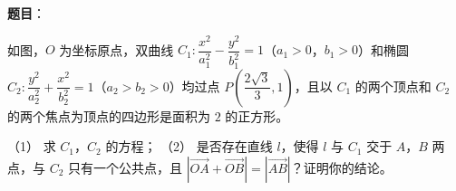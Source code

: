 \begin{answer}


\end{answer}
\begin{answer}

\textbf{题目}：

如图，$O$ 为坐标原点，双曲线 $C_1:\dfrac{x^2}{a_1^2}-\dfrac{y^2}{b_1^2}=1$（$a_1>0$，$b_1>0$）和椭圆 $C_2:\dfrac{y^2}{a_2^2}+\dfrac{x^2}{b_2^2}=1$（$a_2>b_2>0$）均过点 $P\left(\dfrac{2\sqrt3}3,1\right)$，且以 $C_1$ 的两个顶点和 $C_2$ 的两个焦点为顶点的四边形是面积为 $2$ 的正方形。
\nopagebreak[4]
\begin{center}\end{center}
\nopagebreak[4]
（1） 求 $C_1$，$C_2$ 的方程；
（2） 是否存在直线 $l$，使得 $l$ 与 $C_1$ 交于 $A$，$B$ 两点，与 $C_2$ 只有一个公共点，且 $|\overrightarrow{OA}+\overrightarrow{OB}|=|\overrightarrow{AB}|$？证明你的结论。


\end{answer}
